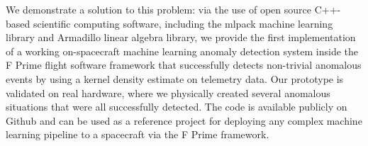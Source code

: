 \documentclass[10pt, fleqn]{article}
\begin{document}
We demonstrate a solution to this problem:
via the use of open source C++-based scientific computing software,
including the mlpack machine learning library
and Armadillo linear algebra library,
we provide the first implementation of a
working on-spacecraft machine learning anomaly detection system
inside the F Prime flight software framework
that successfully detects non-trivial anomalous events
by using a kernel density estimate on telemetry data.
Our prototype is validated on real hardware,
where we physically created several anomalous situations
that were all successfully detected.
The code is available publicly on Github
and can be used as a reference project for deploying
any complex machine learning pipeline
to a spacecraft via the F Prime framework.

\end{document}
